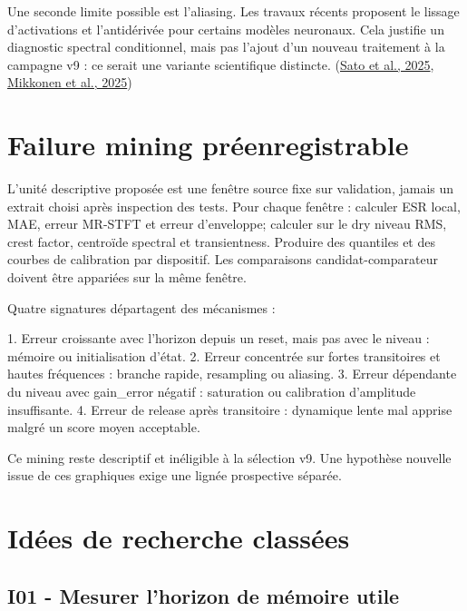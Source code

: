 \documentclass[10pt,a4paper]{article}
\begin{document}
Une seconde limite possible est l'aliasing. Les travaux r\'{e}cents proposent le
lissage d'activations et l'antid\'{e}riv\'{e}e pour certains mod\`{e}les neuronaux. Cela
justifie un diagnostic spectral conditionnel, mais pas l'ajout d'un nouveau
traitement \`{a} la campagne v9 : ce serait une variante scientifique distincte.
(\href{https://arxiv.org/abs/2505.04082}{Sato et al., 2025},
\href{https://dafx.de/paper-archive/details/ZjW5x1v0V0iVtRp_jt4bzA}{Mikkonen et al., 2025})

\section{Failure mining pr\'{e}enregistrable}

L'unit\'{e} descriptive propos\'{e}e est une fen\^{e}tre source fixe sur validation, jamais
un extrait choisi apr\`{e}s inspection des tests. Pour chaque fen\^{e}tre : calculer ESR
local, MAE, erreur MR-STFT et erreur d'enveloppe; calculer sur le dry niveau RMS,
crest factor, centro\"{i}de spectral et transientness. Produire des quantiles et des
courbes de calibration par dispositif. Les comparaisons candidat-comparateur
doivent \^{e}tre appari\'{e}es sur la m\^{e}me fen\^{e}tre.

Quatre signatures d\'{e}partagent des m\'{e}canismes :

1. Erreur croissante avec l'horizon depuis un reset, mais pas avec le niveau :
   m\'{e}moire ou initialisation d'\'{e}tat.
2. Erreur concentr\'{e}e sur fortes transitoires et hautes fr\'{e}quences : branche rapide,
   resampling ou aliasing.
3. Erreur d\'{e}pendante du niveau avec gain\_error n\'{e}gatif : saturation ou calibration
   d'amplitude insuffisante.
4. Erreur de release apr\`{e}s transitoire : dynamique lente mal apprise malgr\'{e} un
   score moyen acceptable.

Ce mining reste descriptif et in\'{e}ligible \`{a} la s\'{e}lection v9. Une hypoth\`{e}se nouvelle
issue de ces graphiques exige une lign\'{e}e prospective s\'{e}par\'{e}e.

\section{Id\'{e}es de recherche class\'{e}es}

\subsection{I01 - Mesurer l'horizon de m\'{e}moire utile}
\end{document}
